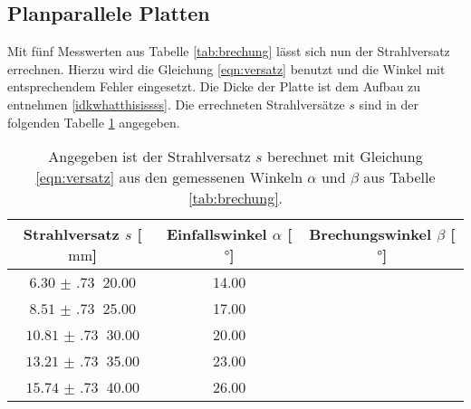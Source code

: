 \subsection{Planparallele Platten}
Mit fünf Messwerten aus Tabelle \ref{tab:brechung} lässt sich nun der Strahlversatz errechnen. Hierzu wird die Gleichung \eqref{eqn:versatz}
benutzt und die Winkel mit entsprechendem Fehler eingesetzt. Die Dicke der Platte ist dem Aufbau zu entnehmen \ref{idkwhatthisissss}.
Die errechneten Strahlversätze $s$ sind in der folgenden Tabelle \ref{tab:wrtfffffffffff} angegeben.
\begin{table}
    \centering
    \caption{Angegeben ist der Strahlversatz $s$ berechnet mit Gleichung \eqref{eqn:versatz} aus den gemessenen Winkeln $\alpha$ und $\beta$ aus Tabelle \ref{tab:brechung}.}
    \label{tab:wrtfffffffffff}
    \begin{tabular}{c | c c}
        \toprule
        Strahlversatz $s$ [$\si{\milli\meter}$] & Einfallswinkel $\alpha$ [$\si{\degree}$] & Brechungswinkel $\beta$ [$\si{\degree}$] \\
        \midrule
        $\SI{6.30(73)}{}$ 20.00 & 14.00 \\
        $\SI{8.51(73)}{}$ 25.00 & 17.00 \\
        $\SI{10.81(73)}{}$ 30.00 & 20.00 \\
        $\SI{13.21(73)}{}$ 35.00 & 23.00 \\
        $\SI{15.74(73)}{}$ 40.00 & 26.00 \\
        \bottomrule    
    \end{tabular}
\end{table}

